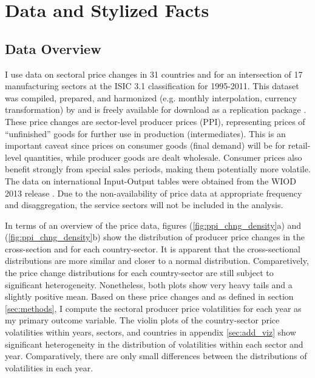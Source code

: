\section{Data and Stylized Facts}
\label{sec:datafacts}

\subsection{Data Overview}

I use data on sectoral price changes in 31 countries and for an intersection of 17 manufacturing sectors at the ISIC 3.1 classification
for 1995-2011. This dataset was compiled, prepared, and harmonized (e.g. monthly interpolation, currency transformation) 
by \textcite{auer2019InternationalInflationSpillovers} and is freely available for download as a replication package 
\parencite{levchenko2020ReplicationDataInternational}. These price changes are sector-level producer prices (PPI), representing 
prices of ``unfinished'' goods for further use in production (intermediates). This is an important caveat since prices on consumer goods 
(final demand) will be for retail-level quantities, while producer goods are dealt wholesale. Consumer prices also benefit strongly from 
special sales periods, making them potentially more volatile. The data on international Input-Output tables were obtained from the WIOD 2013 
release \parencite{timmer2015IllustratedUserGuide}. Due to the non-availability of price data at appropriate frequency and disaggregation, 
the service sectors will not be included in the analysis.

In terms of an overview of the price data, figures (\ref{fig:ppi_chng_density}a) and (\ref{fig:ppi_chng_density}b) show the distribution 
of producer price changes in the cross-section and for each country-sector. It is apparent that the cross-sectional distributions are 
more similar and closer to a normal distribution. Comparetively, the price change distributions for each country-sector are still subject 
to significant heterogeneity. Nonetheless, both plots show very heavy tails and a slightly positive mean. Based on these price changes and 
as defined in section \ref{sec:methods}, I compute the sectoral producer price volatilities for each year as my primary outcome variable. 
The violin plots of the country-sector price volatilities within years, sectors, and countries in appendix \ref{sec:add_viz} show 
significant heterogeneity in the distribution of volatilities within each sector and year. Comparatively, there are only small differences 
between the distributions of volatilities in each year.

